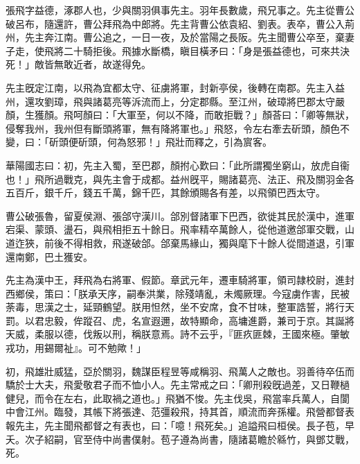 
\begin{pinyinscope}
張飛字益德，涿郡人也，少與關羽俱事先主。羽年長數歲，飛兄事之。先主從曹公破呂布，隨還許，曹公拜飛為中郎將。先主背曹公依袁紹、劉表。表卒，曹公入荊州，先主奔江南。曹公追之，一日一夜，及於當陽之長阪。先主聞曹公卒至，棄妻子走，使飛將二十騎拒後。飛據水斷橋，瞋目橫矛曰：「身是張益德也，可來共決死！」敵皆無敢近者，故遂得免。

先主旣定江南，以飛為宜都太守、征虜將軍，封新亭侯，後轉在南郡。先主入益州，還攻劉璋，飛與諸葛亮等泝流而上，分定郡縣。至江州，破璋將巴郡太守嚴顏，生獲顏。飛呵顏曰：「大軍至，何以不降，而敢拒戰？」顏荅曰：「卿等無狀，侵奪我州，我州但有斷頭將軍，無有降將軍也。」飛怒，令左右牽去斫頭，顏色不變，曰：「斫頭便斫頭，何為怒邪！」飛壯而釋之，引為賔客。

華陽國志曰：初，先主入蜀，至巴郡，顏拊心歎曰：「此所謂獨坐窮山，放虎自衞也！」飛所過戰克，與先主會于成都。益州旣平，賜諸葛亮、法正、飛及關羽金各五百斤，銀千斤，錢五千萬，錦千匹，其餘頒賜各有差，以飛領巴西太守。

曹公破張魯，留夏侯淵、張郃守漢川。郃別督諸軍下巴西，欲徙其民於漢中，進軍宕渠、蒙頭、盪石，與飛相拒五十餘日。飛率精卒萬餘人，從他道邀郃軍交戰，山道迮狹，前後不得相救，飛遂破郃。郃棄馬緣山，獨與麾下十餘人從間道退，引軍還南鄭，巴土獲安。

先主為漢中王，拜飛為右將軍、假節。章武元年，遷車騎將軍，領司隷校尉，進封西鄉侯，策曰：「朕承天序，嗣奉洪業，除殘靖亂，未燭厥理。今寇虜作害，民被荼毒，思漢之士，延頸鶴望。朕用怛然，坐不安席，食不甘味，整軍誥誓，將行天罰。以君忠毅，侔蹤召、虎，名宣遐邇，故特顯命，高墉進爵，兼司于京。其誕將天威，柔服以德，伐叛以刑，稱朕意焉。詩不云乎，『匪疚匪棘，王國來極。肇敏戎功，用錫爾祉』。可不勉歟！」

初，飛雄壯威猛，亞於關羽，魏謀臣程昱等咸稱羽、飛萬人之敵也。羽善待卒伍而驕於士大夫，飛愛敬君子而不恤小人。先主常戒之曰：「卿刑殺旣過差，又日鞭檛健兒，而令在左右，此取禍之道也。」飛猶不悛。先主伐吳，飛當率兵萬人，自閬中會江州。臨發，其帳下將張達、范彊殺飛，持其首，順流而奔孫權。飛營都督表報先主，先主聞飛都督之有表也，曰：「噫！飛死矣。」追謚飛曰桓侯。長子苞，早夭。次子紹嗣，官至侍中尚書僕射。苞子遵為尚書，隨諸葛瞻於緜竹，與鄧艾戰，死。


\end{pinyinscope}